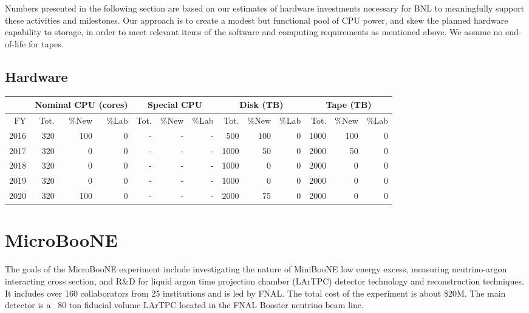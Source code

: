 \documentclass[pdftex,12pt,letter]{article}
\begin{document}
\noindent Numbers presented in the following section are based on our
estimates of hardware investments necessary for BNL to meaningfully
support these activities and milestones. 
Our approach is to create a modest but functional pool of CPU power,
and skew the planned hardware capability to storage, in order to meet
relevant items of the software and computing requirements as mentioned
above.  We assume no end-of-life for tapes.

\subsection{Hardware}

\begin{tabular}[h]{|r || r|r|r || r|r|r || r|r|r || r|r|r ||}
  \hline
   & \multicolumn{3}{c||}{Nominal CPU (cores)} & \multicolumn{3}{c||}{Special CPU} & \multicolumn{3}{c||}{Disk (TB)} & \multicolumn{3}{c||}{Tape (TB)} \\
   \hline
  FY & Tot. & \%New & \%Lab & Tot. & \%New & \%Lab & Tot. & \%New & \%Lab & Tot. & \%New & \%Lab \\
  \hline
  2016  &  320 &  100   & 0 & - & - & - & 500 & 100 & 0 & 1000 & 100 &  0 \\
  \hline
  2017 &  320 &   0     & 0 & - & - & - & 1000  & 50 & 0 & 2000 & 50    &  0 \\
  \hline
  2018 &  320 &   0     & 0 & - & - & - & 1000  & 0   & 0 & 2000 & 0      &  0 \\
  \hline
  2019  &  320 &  0    & 0 & - & - & - & 1000  &  0 & 0 & 2000 & 0     &  0 \\
  \hline
  2020 &  320 &  100     & 0 & - & - & - & 2000  & 75   & 0 & 2000 & 0    &  0 \\
  \hline
\end{tabular}

\pagebreak
\section{MicroBooNE}

The goals of the MicroBooNE experiment include investigating the nature of 
MiniBooNE low energy excess, measuring neutrino-argon interacting cross section,
and R\&D for liquid argon time projection chamber (LArTPC) detector technology 
and reconstruction techniques. It includes over 160 collaborators from 
25 institutions and is led by FNAL. The total cost of the experiment is about 
\$20M. The main detector is a ~80 ton fiducial volume LArTPC located in the 
FNAL Booster neutrino beam line. 
\end{document}
